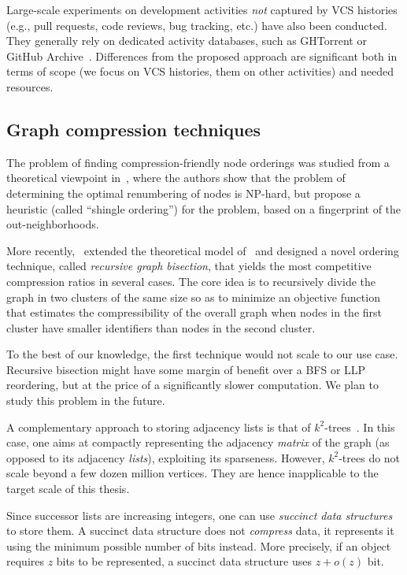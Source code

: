 Large-scale experiments on development activities \emph{not} captured by VCS
histories (e.g., pull requests, code reviews, bug tracking, etc.) have also
been conducted. They generally rely on dedicated activity databases, such as
GHTorrent or GitHub Archive~\cite{GHTorrent, ray2014large}. Differences from
the proposed approach are significant both in terms of scope (we focus on VCS
histories, them on other activities) and needed resources.


\subsection{Graph compression techniques}

The problem of finding compression-friendly node orderings was studied from a
theoretical viewpoint in~\cite{CKLCSN}, where the authors show that the problem
of determining the optimal renumbering of nodes is NP-hard, but propose a
heuristic (called ``shingle ordering'') for the problem, based on a fingerprint
of the out-neighborhoods.

More recently,~\cite{DKKCGIRGB} extended the theoretical model of~\cite{CKLCSN}
and designed a novel ordering technique, called \emph{recursive graph
bisection}, that yields the most competitive compression ratios in several
cases. The core idea is to recursively divide the graph in two clusters of the
same size so as to minimize an objective function that estimates the
compressibility of the overall graph when nodes in the first cluster have
smaller identifiers than nodes in the second cluster.

To the best of our knowledge, the first technique would not scale to our use
case. Recursive bisection might have some margin of benefit over a BFS or LLP
reordering, but at the price of a significantly slower computation. We plan to
study this problem in the future.

A complementary approach to storing adjacency lists is that of
$k^2$-trees~\cite{Brisaboa2014152}. In this case, one aims at compactly
representing the adjacency \emph{matrix} of the graph (as opposed to its
adjacency \emph{lists}), exploiting its sparseness.  However, $k^2$-trees do
not scale beyond a few dozen million vertices. They are hence inapplicable to
the target scale of this thesis.

Since successor lists are increasing integers, one can use \emph{succinct data
  structures}~\cite{NavCDS} to store them. A succinct data structure does not
\emph{compress} data, it represents it using the minimum possible number of
bits instead.
More precisely, if an object requires $z$ bits to be represented, a succinct
data structure uses $z+o(z)$ bit.

